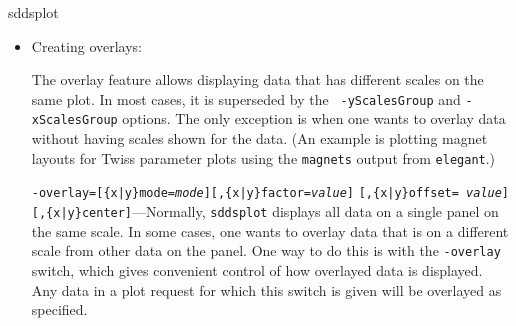 \begin{sddsprog}{sddsplot}
\begin{itemize}
\begin{itemize}
  \item {\tt -lSpace={\em qmin},{\em qmax},{\em pmin},{\em pmax}}---Specifies the region in which
legends will be placed.  The coordinates are pspace coordinates.  Since the legends are typically
outside the pspace, the coordinates may be greater than unity.  For example, the default values are
[1.02, 1.18]x[0.0, 1.0].  This option is usually used to place the legend inside the pspace, or to
extend the size of the lspace to accomodate long legend text.

  \item {\tt -pointLabel={\em name}[,edit={\em editCommand}][,scale={\em number}]
        [,justifyMode=\{rcl\}\{bct\}]} --- Specifies labeling of individual data points using
        data from column or parameter {\em name}.  The labels may be edited by specifying an
        {\em editCommand} with the {\tt edit} qualifier.  The {\tt scale} qualifier may be
        used to scale the label size.  The {\tt justifyMode} qualifer is used to change the
        location of the label relative to the point; the first letter gives the horizontal
        justification (right, center, or left) and the second gives the vertical
        justification (bottom, center, or top). The justification mode may also be embedded  in
        the string; if the string ends with \$j{\em XY}, then {\em X} and {\em Y} are the
        horizontal and vertical justification, respectively, for that string.
        
  \end{itemize}

\item Creating overlays:

The overlay feature allows displaying data that has different scales
on the same plot.  In most cases, it is superseded by the {\tt
-yScalesGroup} and {\tt -xScalesGroup} options.  The only exception is
when one wants to overlay data without having scales shown for the
data.  (An example is plotting magnet layouts for Twiss parameter
plots using the {\tt magnets} output from {\tt elegant}.)

{\tt -overlay=[\{x|y\}mode={\em mode}][,\{x|y\}factor={\em value}]} {\tt [,\{x|y\}offset={\em
value}]} {\tt [,\{x|y\}center]}---Normally, \verb|sddsplot| displays all data on a single panel on the same
scale.  In some cases, one wants to overlay data that is on a different scale from other data on the
panel.  One way to do this is with the {\tt -overlay} switch, which gives convenient control of how
overlayed data is displayed.  Any data in a plot request for which this switch is given will be
overlayed as specified.


\end{itemize}
\end{sddsprog}
